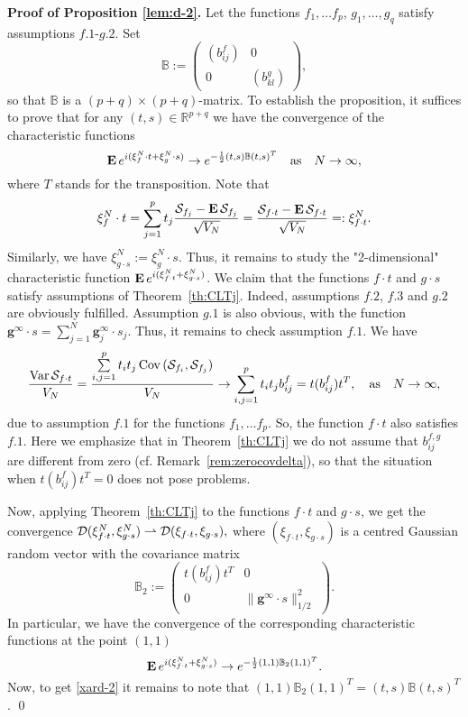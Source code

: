 \documentclass{article}
\numberwithin{equation}{section}
\newcommand{\mR}{\mathbb{R}}
\newcommand{\mB}{\mathbb{B}}
\newcommand{\DD}{{\cal D}}
\newcommand{\SSS}{{\cal S}}
\newcommand{\Cov}{\operatorname{Cov}}
\newcommand{\Var}{\operatorname{Var}}
\newcommand{\MO}{\mbox{\bf E}\,}
\newcommand{\raw}{\rightharpoonup}
\newcommand{\sli}{\sum\limits}
\newcommand{\lbl}{\label}
\newcommand{\ass}{\quad\mbox{as}\quad}
\newcommand{\bee}{\begin{equation}}
\newcommand{\eee}{\end{equation}}
\begin{document}
{\bf Proof of Proposition \ref{lem:d-2}.}
Let the functions $f_1,\ldots f_p$, $g_1,\ldots,g_q$ satisfy
assumptions $f.1$-$g.2$.
Set
$$\mB:=
\begin{pmatrix}
(b^f_{ij}) & 0 \\
0& (b^{g}_{kl})
\end{pmatrix},$$ 
so that $\mB$ is a $(p+q)\times(p+q)$-matrix.
To establish the proposition, it suffices to prove that for any $(t,s)\in\mR^{p+q}$ we have the convergence of the characteristic functions
\bee\lbl{xard-2}
\MO e^{i(\xi_f^N\cdot t+\xi_g^N\cdot s )}
\to
e^{-\frac12(t,s)\mB(t,s)^T}
\ass N\to\infty,
\eee
where $T$ stands for the transposition.
Note that 
$$
\xi^N_f\cdot t=\sli_{j=1}^p t_j\frac{\SSS_{f_j}-\MO\SSS_{f_j}}{\sqrt{V_N}}
=\frac{\SSS_{f\cdot t}-\MO\SSS_{f\cdot t}}{\sqrt{V_N}}=:\xi^N_{f\cdot t}.
$$
Similarly, we have $\xi^N_{g\cdot s}:=\xi_g^N\cdot s$.
Thus, it remains to study the "2-dimensional" characteristic function
$\MO e^{i(\xi^N_{f\cdot t}+\xi^N_{g\cdot s})}$.
We claim that the functions $f\cdot t$ and $g\cdot s$ satisfy assumptions of Theorem~\ref{th:CLTj}.
Indeed, assumptions $f.2$, $f.3$ and $g.2$ are obviously fulfilled. 
Assumption $g.1$ is also obvious, with  the function 
$\bm g^\infty\cdot s=\sli_{j=1}^N \bm g_j^\infty\cdot s_j$. 
Thus, it remains to check assumption $f.1$. We have
$$
\frac{\Var\SSS_{f\cdot t}}{V_N}=\frac{\sli_{i,j=1}^pt_i t_j\Cov{(\SSS_{f_i},\SSS_{f_j})}}{V_N}
\to \sli_{i,j=1}^p t_i t_j b_{ij}^f=t(b^f_{ij})t^T,
\ass N\to\infty,
$$
due to assumption $f.1$ for the functions $f_1,\ldots f_p$. 
So, the function $f\cdot t$ also satisfies $f.1$.
Here we emphasize that in Theorem~\ref{th:CLTj} we do not assume that $b_{ij}^{f,g}$ are different from zero (cf. Remark~\ref{rem:zerocovdelta}), 
so that the situation when $t(b^f_{ij})t^T=0$ 
does not pose problems.

Now, applying Theorem~\ref{th:CLTj} to the functions $f\cdot t$ and $g\cdot s$, we get the convergence
$
\DD(\xi_{f\cdot t}^N,\xi_{g\cdot s}^N)\raw \DD(\xi_{f\cdot t},\xi_{g\cdot s}),
$
where $(\xi_{f\cdot t},\xi_{g\cdot s})$ is a centred Gaussian random vector with the covariance matrix
$$\mB_2:=
\begin{pmatrix}
t(b^f_{ij})t^T & 0 \\
0& \|\bm g^\infty\cdot s\|^2_{1/2}
\end{pmatrix}.
$$
In particular, we have the convergence of the corresponding characteristic functions 
at the point $(1,1)$
$$
\MO e^{i(\xi^N_{f\cdot t}+\xi^N_{g\cdot s})}\to e^{-\frac12 (1,1)\mB_2(1,1)^T}.
$$
Now, to get \eqref{xard-2} it remains to note that $(1,1)\mB_2(1,1)^T=(t,s)\mB(t,s)^T$.
\qed
\end{document}
